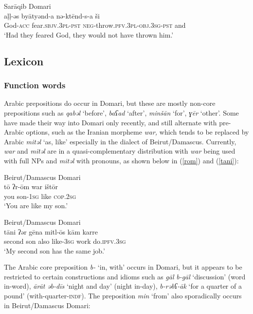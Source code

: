 \documentclass[output=paper]{langsci/langscibook}
\begin{document}
\ea \label{all}
{Sarāqib Domari}\\
\gll aḷḷ-əs byātyənd-a nə-ktēnd-s-a ši\\
     God-\textsc{acc} fear.\textsc{sbjv.3pl}{}-\textsc{pst} \textsc{neg}{}-throw.\textsc{pfv.3pl-obj.3sg-pst} and\\
\glt ‘Had they feared God, they would not have thrown him.’
\z

 \subsection{Lexicon}
 \subsubsection{Function words}

Arabic prepositions do occur in Domari, but these are mostly non-core prepositions such as \textit{qabəl} ‘before’, \textit{baʕad} ‘after’, \textit{minšān} ‘for’, \textit{ɣēr} ‘other’. Some have made their way into Domari only recently, and still alternate with pre-Arabic options, such as the Iranian morpheme \textit{war,} which tends to be replaced by Arabic \textit{mitəl} ‘as, like’ especially in the dialect of Beirut/Damascus. Currently, \textit{war} and \textit{mitəl} are in a quasi-complementary distribution with \textit{war} being used with full NPs and \textit{mitəl} with pronouns, as shown below in (\ref{rom}) and (\ref{tani}):

\ea
{Beirut/Damascus Domari}\\ \label{rom}
\gll tō ʔr-ōm war ištōr\\
     you son-\textsc{1sg} like \textsc{cop.2sg}\\
\glt ‘You are like my son.’
\z

\ea\label{ex:key:} \label{tani}
{Beirut/Damascus Domari}\\
\gll tāni ʔər gēna mitl-ōs kām karre\\
     second son also like-\textsc{3sg} work do.\textsc{ipfv.3sg}\\
\glt ‘My second son has the same job.’
\z

The Arabic core preposition \textit{b-} ‘in, with’ occurs in Domari, but it appears to be restricted to certain constructions and idioms such as \textit{gāl} \textit{b-gāl} ‘discussion’ (word in-word), \textit{ārāt} \textit{əb-dīs} ‘night and day’ (night in-day), \textit{b-rəbʕ-āk} ‘for a quarter of a pound’ (with-quarter-\textsc{indf}). The preposition \textit{min} ‘from’ also sporadically occurs in Beirut/Damascus Domari:
\end{document}
